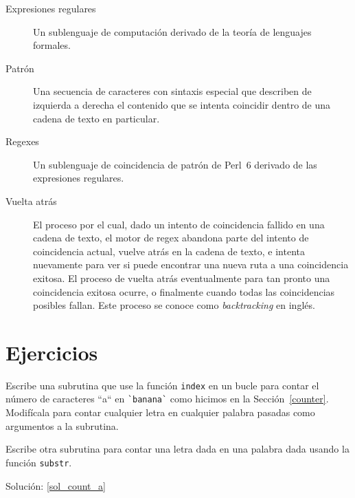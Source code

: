\begin{description}
\item[Expresiones  regulares] Un sublenguaje de computación
derivado de la teoría de lenguajes formales.

\item[Patrón] Una secuencia de caracteres con sintaxis especial
que describen de izquierda a derecha el contenido que se intenta
coincidir dentro de una cadena de texto en particular.

\item[Regexes] Un sublenguaje de coincidencia de patrón de Perl~6
derivado de las expresiones regulares.

\item[Vuelta atrás] El proceso por el cual,
dado un intento de coincidencia fallido en una cadena de texto, el motor de regex 
abandona parte del intento de coincidencia actual, vuelve atrás
en la cadena de texto, e intenta nuevamente para ver si puede
encontrar una nueva ruta a una coincidencia exitosa. 
El proceso de vuelta atrás eventualmente para tan pronto una
coincidencia exitosa ocurre, o finalmente cuando todas las 
coincidencias posibles fallan. Este proceso se conoce como
\emph{backtracking} en inglés.

\end{description}


\section{Ejercicios}


\begin{exercise}
\label{count_a}

Escribe una subrutina que use la función {\tt index}  en un bucle
para contar el número de caracteres ``a`` en \verb|`banana`| como 
hicimos en la Sección~\ref{counter}. Modifícala para contar
cualquier letra en cualquier palabra pasadas como argumentos 
a la subrutina.

Escribe otra subrutina para contar una letra dada en una 
palabra dada usando la función {\tt substr}.

Solución: \ref{sol_count_a}
\end{exercise}


